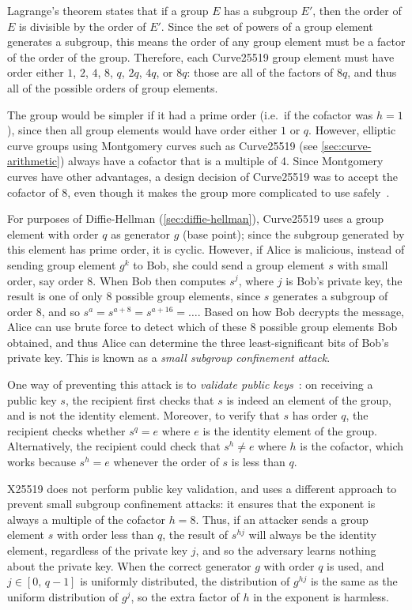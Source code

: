 \documentclass[manuscript]{acmart}
\begin{document}
Lagrange's theorem states that if a group $E$ has a subgroup $E'$, then the order of $E$ is divisible by the order of $E'$.
Since the set of powers of a group element generates a subgroup, this means the order of any group element must be a factor of the order of the group.
Therefore, each Curve25519 group element must have order either $1$, $2$, $4$, $8$, $q$, $2q$, $4q$, or $8q$: those are all of the factors of $8q$, and thus all of the possible orders of group elements.

The group would be simpler if it had a prime order (i.e.\ if the cofactor was $h=1$), since then all group elements would have order either $1$ or $q$.
However, elliptic curve groups using Montgomery curves such as Curve25519 (see \autoref{sec:curve-arithmetic}) always have a cofactor that is a multiple of 4.
Since Montgomery curves have other advantages, a design decision of Curve25519 was to accept the cofactor of 8, even though it makes the group more complicated to use safely~\cite{Hamburg:2015}.

For purposes of Diffie-Hellman (\autoref{sec:diffie-hellman}), Curve25519 uses a group element with order $q$ as generator $g$ (base point); since the subgroup generated by this element has prime order, it is cyclic.
However, if Alice is malicious, instead of sending group element $g^k$ to Bob, she could send a group element $s$ with small order, say order 8.
When Bob then computes $s^j$, where $j$ is Bob's private key, the result is one of only 8 possible group elements, since $s$ generates a subgroup of order 8, and so $s^a = s^{a+8} = s^{a+16} = \dots$.
Based on how Bob decrypts the message, Alice can use brute force to detect which of these 8 possible group elements Bob obtained, and thus Alice can determine the three least-significant bits of Bob's private key.
This is known as a \emph{small subgroup confinement attack}.

One way of preventing this attack is to \emph{validate public keys}~\cite{Antipa:2003}: on receiving a public key $s$, the recipient first checks that $s$ is indeed an element of the group, and is not the identity element.
Moreover, to verify that $s$ has order $q$, the recipient checks whether $s^q = e$ where $e$ is the identity element of the group.
Alternatively, the recipient could check that $s^h \ne e$ where $h$ is the cofactor, which works because $s^h = e$ whenever the order of $s$ is less than $q$.

X25519 does not perform public key validation, and uses a different approach to prevent small subgroup confinement attacks: it ensures that the exponent is always a multiple of the cofactor $h=8$.
Thus, if an attacker sends a group element $s$ with order less than $q$, the result of $s^{hj}$ will always be the identity element, regardless of the private key $j$, and so the adversary learns nothing about the private key.
When the correct generator $g$ with order $q$ is used, and $j \in [0,\, q-1]$ is uniformly distributed, the distribution of $g^{hj}$ is the same as the uniform distribution of $g^j$, so the extra factor of $h$ in the exponent is harmless.
\end{document}
